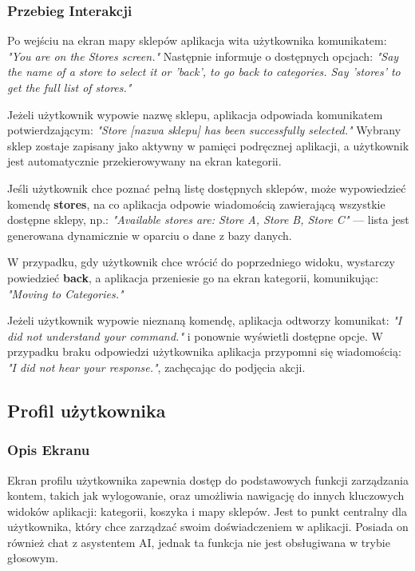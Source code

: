 \subsubsection{Przebieg Interakcji}
Po wejściu na ekran mapy sklepów aplikacja wita użytkownika komunikatem: \textit{"You are on the Stores screen."} Następnie informuje o dostępnych opcjach: \textit{"Say the name of a store to select it or 'back', to go back to categories. Say 'stores' to get the full list of stores."}

Jeżeli użytkownik wypowie nazwę sklepu, aplikacja odpowiada komunikatem potwierdzającym: \textit{"Store [nazwa sklepu] has been successfully selected."} Wybrany sklep zostaje zapisany jako aktywny w pamięci podręcznej aplikacji, a użytkownik jest automatycznie przekierowywany na ekran kategorii.

Jeśli użytkownik chce poznać pełną listę dostępnych sklepów, może wypowiedzieć komendę \textbf{stores}, na co aplikacja odpowie wiadomością zawierającą wszystkie dostępne sklepy, np.: \textit{"Available stores are: Store A, Store B, Store C"} — lista jest generowana dynamicznie w oparciu o dane z bazy danych.

W przypadku, gdy użytkownik chce wrócić do poprzedniego widoku, wystarczy powiedzieć \textbf{back}, a aplikacja przeniesie go na ekran kategorii, komunikując: \textit{"Moving to Categories."}

Jeżeli użytkownik wypowie nieznaną komendę, aplikacja odtworzy komunikat: \textit{"I did not understand your command."} i ponownie wyświetli dostępne opcje. W przypadku braku odpowiedzi użytkownika aplikacja przypomni się wiadomością: \textit{"I did not hear your response."}, zachęcając do podjęcia akcji.

\subsection{Profil użytkownika}

\subsubsection{Opis Ekranu}
Ekran profilu użytkownika zapewnia dostęp do podstawowych funkcji zarządzania kontem, takich jak wylogowanie, oraz umożliwia nawigację do innych kluczowych widoków aplikacji: kategorii, koszyka i mapy sklepów. Jest to punkt centralny dla użytkownika, który chce zarządzać swoim doświadczeniem w aplikacji. Posiada on również chat z asystentem AI, jednak ta funkcja nie jest obsługiwana w trybie głosowym.

